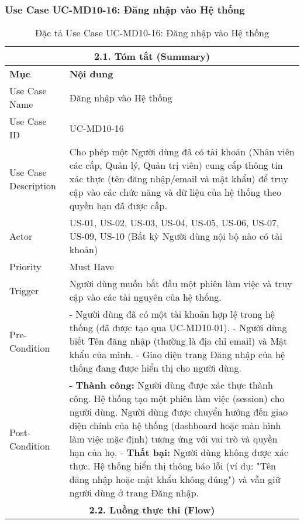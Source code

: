 \subsubsection{Use Case UC-MD10-16: Đăng nhập vào Hệ thống}
\begin{longtable}{|m{4cm}|p{11cm}|}
\caption{Đặc tả Use Case UC-MD10-16: Đăng nhập vào Hệ thống} \label{tab:uc_md10_16_login_in_codeblock} \\
\hline
\multicolumn{2}{|c|}{\textbf{2.1. Tóm tắt (Summary)}} \\
\hline
\textbf{Mục} & \textbf{Nội dung} \\
\hline
\endhead %
\midrule
\endfoot %
\bottomrule
\endlastfoot %
Use Case Name & Đăng nhập vào Hệ thống \\
\hline
Use Case ID & UC-MD10-16 \\
\hline
Use Case Description & Cho phép một Người dùng đã có tài khoản (Nhân viên các cấp, Quản lý, Quản trị viên) cung cấp thông tin xác thực (tên đăng nhập/email và mật khẩu) để truy cập vào các chức năng và dữ liệu của hệ thống theo quyền hạn đã được cấp. \\
\hline
Actor & US-01, US-02, US-03, US-04, US-05, US-06, US-07, US-09, US-10 (Bất kỳ Người dùng nội bộ nào có tài khoản) \\
\hline
Priority & Must Have \\
\hline
Trigger & Người dùng muốn bắt đầu một phiên làm việc và truy cập vào các tài nguyên của hệ thống. \\
\hline
Pre-Condition & - Người dùng đã có một tài khoản hợp lệ trong hệ thống (đã được tạo qua UC-MD10-01). \newline - Người dùng biết Tên đăng nhập (thường là địa chỉ email) và Mật khẩu của mình. \newline - Giao diện trang Đăng nhập của hệ thống đang được hiển thị cho người dùng. \\
\hline
Post-Condition & - \textbf{Thành công:} Người dùng được xác thực thành công. Hệ thống tạo một phiên làm việc (session) cho người dùng. Người dùng được chuyển hướng đến giao diện chính của hệ thống (dashboard hoặc màn hình làm việc mặc định) tương ứng với vai trò và quyền hạn của họ. \newline - \textbf{Thất bại:} Người dùng không được xác thực. Hệ thống hiển thị thông báo lỗi (ví dụ: "Tên đăng nhập hoặc mật khẩu không đúng") và vẫn giữ người dùng ở trang Đăng nhập. \\
\hline
\multicolumn{2}{|c|}{\textbf{2.2. Luồng thực thi (Flow)}} \\

\end{longtable}
